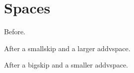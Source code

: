 \documentclass{article}
\begin{document}
\section{Spaces}
Before.

\smallskip\addvspace{\bigskipamount}
After a smallskip and a larger addvspace.

\bigskip\addvspace{\medskipamount}
After a bigskip and a smaller addvspace.
\end{document}
